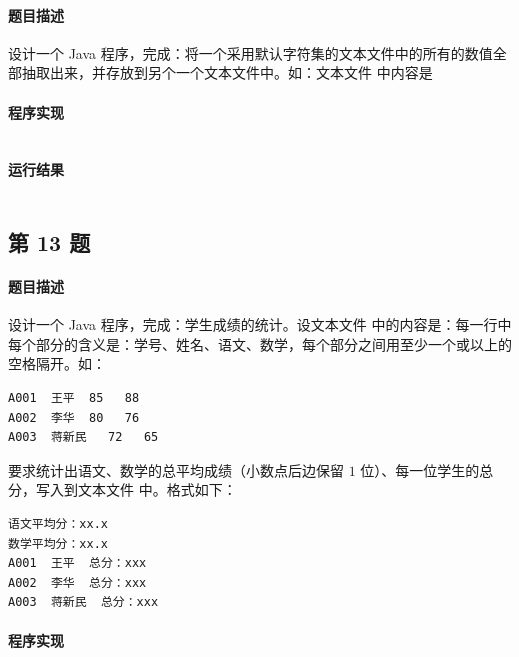 \documentclass{academics}
\begin{document}
\paragraph{题目描述} {
    设计一个 Java 程序，完成：将一个采用默认字符集的文本文件中的所有的数值全部抽取出来，并存放到另个一个文本文件中。如：文本文件  中内容是 \mil{g%
    \mil{897  897  89  l  67  l45  l4  3674  89  90  12   23  45    90}。
}

\paragraph{程序实现} {
    \inputminted[label=ExtractNumbers.java]{java}{../src/P12/ExtractNumbers.java}
}

\paragraph{运行结果} {
    \inputminted{text}{../res/P12.out}
}

\subsection{第 13 题}

\paragraph{题目描述} {
    设计一个 Java 程序，完成：学生成绩的统计。设文本文件  中的内容是：每一行中每个部分的含义是：学号、姓名、语文、数学，每个部分之间用至少一个或以上的空格隔开。如：
    \begin{verbatim}
A001  王平  85   88
A002  李华  80   76
A003  蒋新民   72   65
\end{verbatim}
    要求统计出语文、数学的总平均成绩（小数点后边保留 $1$ 位）、每一位学生的总分，写入到文本文件  中。格式如下：
    \begin{verbatim}
语文平均分：xx.x
数学平均分：xx.x
A001  王平  总分：xxx
A002  李华  总分：xxx
A003  蒋新民  总分：xxx
\end{verbatim}
}

\paragraph{程序实现} {
    \inputminted[label=ScoreStatistics.java]{java}{../src/P13/ScoreStatistics.java}
}

}
\end{document}
